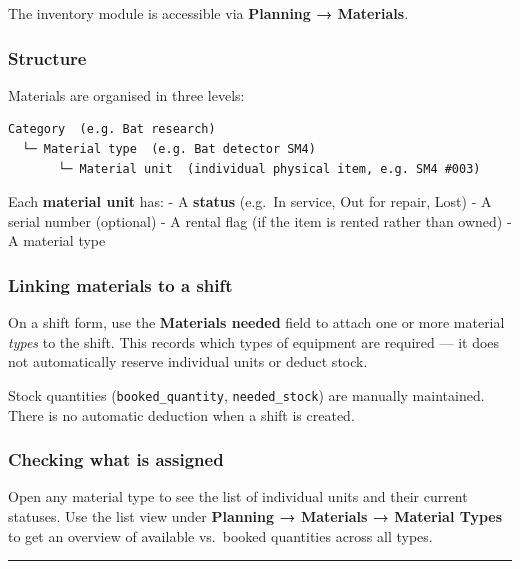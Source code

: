 \documentclass[
  paper=a4,
  ,captions=tableheading
]{scrartcl}
\renewenvironment{quote}{\begin{mdframed}[backgroundcolor=calloutbg,linecolor=calloutborder,linewidth=3pt,topline=false,bottomline=false,rightline=false,innerleftmargin=10pt,innerrightmargin=10pt,innertopmargin=6pt,innerbottommargin=6pt]\small}{\end{mdframed}}
\renewenvironment{quote}{\begin{customblockquote}\list{}{\rightmargin=0em\leftmargin=0em}%
\item\relax\color{blockquote-text}\ignorespaces}{\unskip\unskip\endlist\end{customblockquote}}
\begin{document}
The inventory module is accessible via \textbf{Planning → Materials}.

\hypertarget{structure}{%
\subsubsection{Structure}\label{structure}}

Materials are organised in three levels:

\begin{verbatim}
Category  (e.g. Bat research)
  └─ Material type  (e.g. Bat detector SM4)
       └─ Material unit  (individual physical item, e.g. SM4 #003)
\end{verbatim}

Each \textbf{material unit} has: - A \textbf{status} (e.g.~In service,
Out for repair, Lost) - A serial number (optional) - A rental flag (if
the item is rented rather than owned) - A material type

\hypertarget{linking-materials-to-a-shift}{%
\subsubsection{Linking materials to a
shift}\label{linking-materials-to-a-shift}}

On a shift form, use the \textbf{Materials needed} field to attach one
or more material \emph{types} to the shift. This records which types of
equipment are required --- it does not automatically reserve individual
units or deduct stock.

\begin{quote}
Stock quantities (\texttt{booked\_quantity}, \texttt{needed\_stock}) are
manually maintained. There is no automatic deduction when a shift is
created.
\end{quote}

\hypertarget{checking-what-is-assigned}{%
\subsubsection{Checking what is
assigned}\label{checking-what-is-assigned}}

Open any material type to see the list of individual units and their
current statuses. Use the list view under \textbf{Planning → Materials →
Material Types} to get an overview of available vs.~booked quantities
across all types.

\begin{center}\rule{0.5\linewidth}{0.5pt}\end{center}
\end{document}

